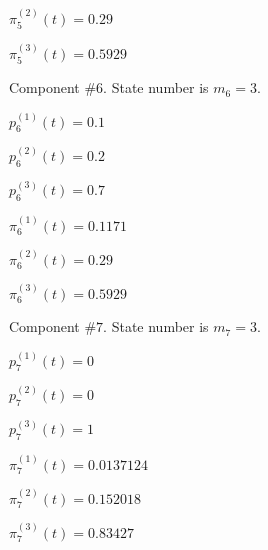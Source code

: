  $\pi^{(2)}_5(t)=0.29$

 $\pi^{(3)}_5(t)=0.5929$

 Component #$6$. State number is $m_6=3$.

 $p^{(1)}_6(t)=0.1$

 $p^{(2)}_6(t)=0.2$

 $p^{(3)}_6(t)=0.7$

 $\pi^{(1)}_6(t)=0.1171$

 $\pi^{(2)}_6(t)=0.29$

 $\pi^{(3)}_6(t)=0.5929$

 Component #$7$. State number is $m_7=3$.

 $p^{(1)}_7(t)=0$

 $p^{(2)}_7(t)=0$

 $p^{(3)}_7(t)=1$

 $\pi^{(1)}_7(t)=0.0137124$

 $\pi^{(2)}_7(t)=0.152018$

 $\pi^{(3)}_7(t)=0.83427$